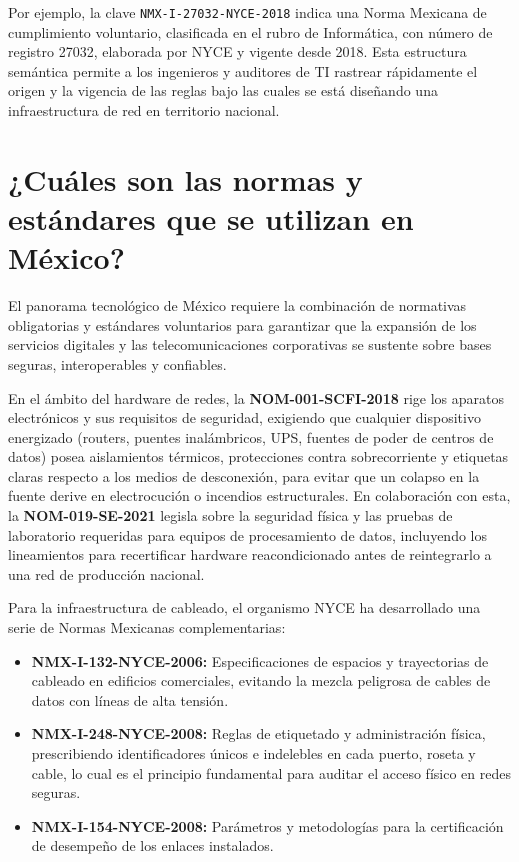 \documentclass[a4paper,12pt]{article}
\begin{document}
Por ejemplo, la clave \texttt{NMX-I-27032-NYCE-2018} indica una Norma Mexicana de cumplimiento voluntario, clasificada en el rubro de Informática, con número de registro 27032, elaborada por NYCE y vigente desde 2018. Esta estructura semántica permite a los ingenieros y auditores de TI rastrear rápidamente el origen y la vigencia de las reglas bajo las cuales se está diseñando una infraestructura de red en territorio nacional.

\newpage

\section{¿Cuáles son las normas y estándares que se utilizan en México?}

El panorama tecnológico de México requiere la combinación de normativas obligatorias y estándares voluntarios para garantizar que la expansión de los servicios digitales y las telecomunicaciones corporativas se sustente sobre bases seguras, interoperables y confiables.

En el ámbito del hardware de redes, la \textbf{NOM-001-SCFI-2018} rige los aparatos electrónicos y sus requisitos de seguridad, exigiendo que cualquier dispositivo energizado (routers, puentes inalámbricos, UPS, fuentes de poder de centros de datos) posea aislamientos térmicos, protecciones contra sobrecorriente y etiquetas claras respecto a los medios de desconexión, para evitar que un colapso en la fuente derive en electrocución o incendios estructurales. En colaboración con esta, la \textbf{NOM-019-SE-2021} legisla sobre la seguridad física y las pruebas de laboratorio requeridas para equipos de procesamiento de datos, incluyendo los lineamientos para recertificar hardware reacondicionado antes de reintegrarlo a una red de producción nacional.

Para la infraestructura de cableado, el organismo NYCE ha desarrollado una serie de Normas Mexicanas complementarias:

\begin{itemize}
    \item \textbf{NMX-I-132-NYCE-2006:} Especificaciones de espacios y trayectorias de cableado en edificios comerciales, evitando la mezcla peligrosa de cables de datos con líneas de alta tensión.
    \item \textbf{NMX-I-248-NYCE-2008:} Reglas de etiquetado y administración física, prescribiendo identificadores únicos e indelebles en cada puerto, roseta y cable, lo cual es el principio fundamental para auditar el acceso físico en redes seguras.
    \item \textbf{NMX-I-154-NYCE-2008:} Parámetros y metodologías para la certificación de desempeño de los enlaces instalados.
\end{itemize}
\end{document}
